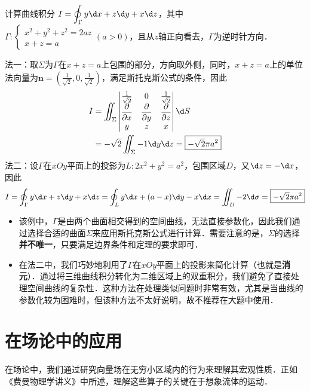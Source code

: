 \documentclass[12pt, a4paper, oneside, UTF8]{ctexbook}
\begin{document}
\begin{example}
    计算曲线积分 $I=\displaystyle\oint_\Gamma y\d x + z\d y + x\d z$，其中 $\Gamma:\begin{cases}
        x^2+y^2+z^2=2az\\
        x+z=a
    \end{cases}(a>0)$，且从$z$轴正向看去，$\Gamma$为逆时针方向．
\end{example}
\begin{solution}
    法一：取$\Sigma$为$\Gamma$在$x+z=a$上包围的部分，方向取外侧，同时，$x+z=a$上的单位法向量为$\bm{n} = (\frac{1}{\sqrt{2}},0,\frac{1}{\sqrt{2}})$，满足斯托克斯公式的条件，因此
    \begin{align*}
        I &= \iint_\Sigma \begin{vmatrix} \frac{1}{\sqrt{2}} & 0 & \frac{1}{\sqrt{2}} \\ \dfrac{\partial}{\partial x} & \dfrac{\partial}{\partial y} & \dfrac{\partial}{\partial z} \\ y & z & x \end{vmatrix}\d S \\
        &= -\sqrt{2}\iint_\Sigma -1 \d y \d z = \boxed{-\sqrt{2}\pi a^2}
    \end{align*}
    法二：设$\Gamma$在$xOy$平面上的投影为$L:2x^2+y^2=a^2$，包围区域$D$，又$\d z=-\d x$，因此
    \[I=\oint_\Gamma y\d x + z\d y + x\d z = \oint_L y\d x + (a-x)\d y - x\d x = \iint_D -2\d \sigma=\boxed{-\sqrt{2}\pi a^2}\]

\end{solution}
\begin{myRemark}
    \begin{itemize}
        \item 该例中，$\Gamma$是由两个曲面相交得到的空间曲线，无法直接参数化，因此我们通过选择合适的曲面$\Sigma$来应用斯托克斯公式进行计算．需要注意的是，$\Sigma$的选择\textbf{并不唯一}，只要满足边界条件和定理的要求即可．
        \item 在法二中，我们巧妙地利用了$\Gamma$在$xOy$平面上的投影来简化计算（也就是\textbf{消元}）．通过将三维曲线积分转化为二维区域上的双重积分，我们避免了直接处理空间曲线的复杂性．这种方法在处理类似问题时非常有效，尤其是当曲线的参数化较为困难时，但该种方法不太好说明，故不推荐在大题中使用．
    \end{itemize}
\end{myRemark}

\section{在场论中的应用}
在场论中，我们通过研究向量场在无穷小区域内的行为来理解其宏观性质．正如《费曼物理学讲义》中所述，理解这些算子的关键在于想象流体的运动．
\end{document}
